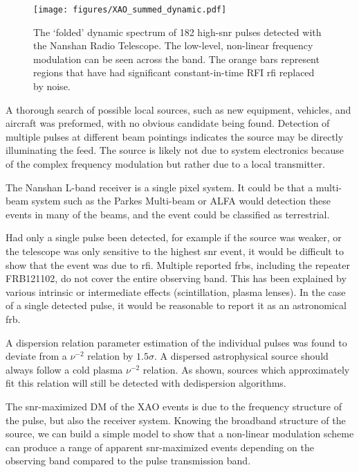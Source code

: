 \documentclass[a4paper,fleqn,usenatbib]{mnras}
\begin{document}
\begin{figure}
    \texttt{[image: figures/XAO\_summed\_dynamic.pdf]}
    \caption{The `folded' dynamic spectrum of 182 high-\gls{snr} pulses detected
    with the Nanshan Radio Telescope.  The low-level, non-linear frequency
    modulation can be seen across the band. The orange bars represent regions
    that have had significant constant-in-time RFI \gls{rfi} replaced by noise.
    }
    \label{fig:xao_summed}
\end{figure}

A thorough search of possible local sources, such as new equipment, vehicles,
and aircraft was preformed, with no obvious candidate being found. Detection of
multiple pulses at different beam pointings indicates the source may be directly
illuminating the feed. The source is likely not due to system electronics
because of the complex frequency modulation but rather due to a local
transmitter.

The Nanshan L-band receiver is a single pixel system. It could be that a
multi-beam system such as the Parkes Multi-beam or ALFA would detection these
events in many of the beams, and the event could be classified as terrestrial.

Had only a single pulse been detected, for example if the source was weaker, or
the telescope was only sensitive to the highest \gls{snr} event, it would be
difficult to show that the event was due to \gls{rfi}.  Multiple reported
\glspl{frb}, including the repeater FRB121102, do not cover the entire observing
band. This has been explained by various intrinsic or intermediate effects
(scintillation, plasma lenses). In the case of a single detected pulse, it would
be reasonable to report it as an astronomical \gls{frb}.

A dispersion relation parameter estimation of the individual pulses was found to
deviate from a $\nu^{-2}$ relation by $1.5 \sigma$. A dispersed astrophysical
source should always follow a cold plasma $\nu^{-2}$ relation. As shown, sources
which approximately fit this relation will still be detected with dedispersion
algorithms.

The \gls{snr}-maximized DM of the XAO events is due to the frequency structure
of the pulse, but also the receiver system.  Knowing the broadband structure of
the source, we can build a simple model to show that a non-linear modulation
scheme can produce a range of apparent \gls{snr}-maximized events depending on
the observing band compared to the pulse transmission band.
\end{document}
